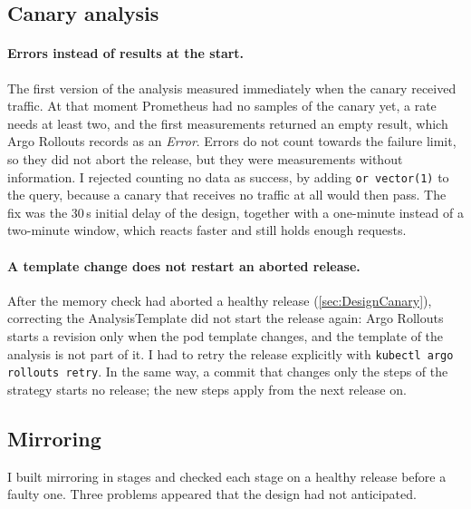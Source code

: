 \subsection{Canary analysis}
\label{sec:ImplCanary}
\paragraph{Errors instead of results at the start.} The first version of the analysis measured immediately when the canary received traffic. At that moment Prometheus had no samples of the canary yet, a rate needs at least two, and the first measurements returned an empty result, which Argo Rollouts records as an \emph{Error}. Errors do not count towards the failure limit, so they did not abort the release, but they were measurements without information. I rejected counting no data as success, by adding \texttt{or vector(1)} to the query, because a canary that receives no traffic at all would then pass. The fix was the 30\,s initial delay of the design, together with a one-minute instead of a two-minute window, which reacts faster and still holds enough requests.

\paragraph{A template change does not restart an aborted release.} After the memory check had aborted a healthy release (\autoref{sec:DesignCanary}), correcting the AnalysisTemplate did not start the release again: Argo Rollouts starts a revision only when the pod template changes, and the template of the analysis is not part of it. I had to retry the release explicitly with \texttt{kubectl argo rollouts retry}. In the same way, a commit that changes only the steps of the strategy starts no release; the new steps apply from the next release on.

\subsection{Mirroring}
\label{sec:ImplMirror}
I built mirroring in stages and checked each stage on a healthy release before a faulty one. Three problems appeared that the design had not anticipated.

